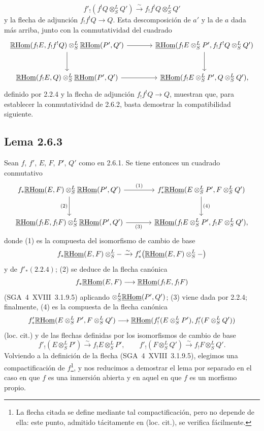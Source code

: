 \[
f'_!(f^!Q\otimes^L_SQ')\xrightarrow{\sim}f_!f^!Q\otimes^L_SQ'
\]
y la flecha de adjunción $f_!f^!Q\to Q$. Esta descomposición de $a'$ y la de $a$ dada más arriba, junto con la conmutatividad del cuadrado
\[
\begin{tikzcd}[column sep=large,row sep=large]
\uRHom(f_!E,f_!f^!Q)\otimes^L_S\uRHom(P',Q') \arrow[r] \arrow[d] & \uRHom(f_!E\otimes^L_SP',f_!f^!Q\otimes^L_SQ') \arrow[d]\\
\uRHom(f_!E,Q)\otimes^L_S\uRHom(P',Q') \arrow[r] & \uRHom(f_!E\otimes^L_SP',Q\otimes^L_SQ'),
\end{tikzcd}
\]
definido por 2.2.4 y la flecha de adjunción $f_!f^!Q\to Q$, muestran que, para establecer la conmutatividad de 2.6.2, basta demostrar la compatibilidad siguiente.

\subsection*{Lema 2.6.3}
Sean $f$, $f'$, $E$, $F$, $P'$, $Q'$ como en 2.6.1. Se tiene entonces un cuadrado conmutativo
\[
\begin{tikzcd}[column sep=large,row sep=large]
f_*\uRHom(E,F)\otimes^L_S\uRHom(P',Q') \arrow[r,"(1)"] \arrow[d,"(2)"'] & f'_*\uRHom(E\otimes^L_SP',F\otimes^L_SQ') \arrow[d,"(4)"]\\
\uRHom(f_!E,f_!F)\otimes^L_S\uRHom(P',Q') \arrow[r,"(3)"'] & \uRHom(f_!E\otimes^L_SP',f_!F\otimes^L_SQ'),
\end{tikzcd}
\]
donde (1) es la compuesta del isomorfismo de cambio de base
\[
f_*\underline{\mathbb{R}\mathrm{Hom}}(E,F)\otimes^L_S -\xrightarrow{\sim}f'_*\bigl(\underline{\mathbb{R}\mathrm{Hom}}(E,F)\otimes^L_S-\bigr)
\]
y de $f'_*(2.2.4)$; (2) se deduce de la flecha canónica
\[
f_*\underline{\mathbb{R}\mathrm{Hom}}(E,F)\longrightarrow\underline{\mathbb{R}\mathrm{Hom}}(f_!E,f_!F)
\]
(SGA~4~XVIII~3.1.9.5) aplicando $\otimes^L_S\underline{\mathbb{R}\mathrm{Hom}}(P',Q')$; (3) viene dada por 2.2.4; finalmente, (4) es la compuesta de la flecha canónica
\[
f'_*\underline{\mathbb{R}\mathrm{Hom}}(E\otimes^L_SP',F\otimes^L_SQ')
\longrightarrow
\underline{\mathbb{R}\mathrm{Hom}}(f'_!(E\otimes^L_SP'),f'_!(F\otimes^L_SQ'))
\]
(loc. cit.) y de las flechas definidas por los isomorfismos de cambio de base
\[
f'_!(E\otimes^L_SP')\xrightarrow{\sim}f_!E\otimes^L_SP',
\qquad
f'_!(F\otimes^L_SQ')\xrightarrow{\sim}f_!F\otimes^L_SQ'.
\]
Volviendo a la definición de la flecha (SGA~4~XVIII~3.1.9.5), elegimos una compactificación de $f$\footnote{La flecha citada se define mediante tal compactificación, pero no depende de ella: este punto, admitido tácitamente en (loc. cit.), se verifica fácilmente.}, y nos reducimos a demostrar el lema por separado en el caso en que $f$ es una inmersión abierta y en aquel en que $f$ es un morfismo propio.

